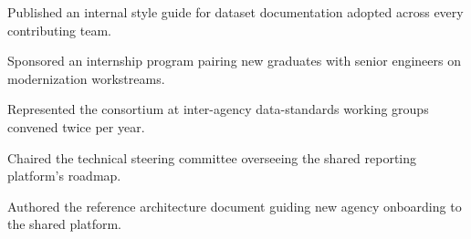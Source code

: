 \documentclass[fontsize=11pt, margin=narrow, medium=print]{careerdossier-resume}
\begin{document}
\begin{CDossierEntry}[title = {Modernization Program}, organization = {Continental Reliability Consortium}, location = {Ottawa, ON}, dates = {2010--Present}]
\begin{CDossierItemize}
    \item Published an internal style guide for dataset documentation adopted across every contributing team.
    \item Sponsored an internship program pairing new graduates with senior engineers on modernization workstreams.
    \item Represented the consortium at inter-agency data-standards working groups convened twice per year.
    \item Chaired the technical steering committee overseeing the shared reporting platform's roadmap.
    \item Authored the reference architecture document guiding new agency onboarding to the shared platform.
  \end{CDossierItemize}
\end{CDossierEntry}
\end{document}
